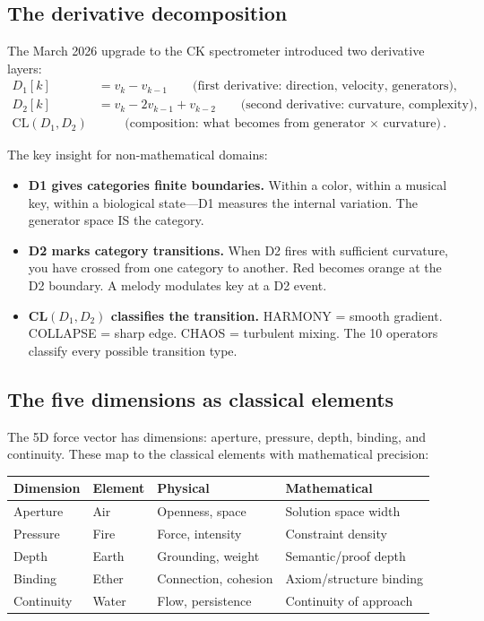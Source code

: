 \documentclass[11pt]{article}
\theoremstyle{definition}
\theoremstyle{remark}
\begin{document}
\subsection{The derivative decomposition}

The March 2026 upgrade to the CK spectrometer introduced two derivative layers:
\begin{align}
  D_1[k] &= v_k - v_{k-1} \qquad\text{(first derivative: direction, velocity, generators)}, \\
  D_2[k] &= v_k - 2v_{k-1} + v_{k-2} \qquad\text{(second derivative: curvature, complexity)}, \\
  \mathrm{CL}(D_1, D_2) &\qquad\text{(composition: what becomes from generator $\times$ curvature)}.
\end{align}

The key insight for non-mathematical domains:
\begin{itemize}[nosep]
  \item \textbf{D1 gives categories finite boundaries.}  Within a color, within a
    musical key, within a biological state---D1 measures the internal variation.  The
    generator space IS the category.
  \item \textbf{D2 marks category transitions.}  When D2 fires with sufficient curvature,
    you have crossed from one category to another.  Red becomes orange at the D2 boundary.
    A melody modulates key at a D2 event.
  \item \textbf{CL$(D_1, D_2)$ classifies the transition.}  HARMONY = smooth gradient.
    COLLAPSE = sharp edge.  CHAOS = turbulent mixing.  The 10 operators classify every
    possible transition type.
\end{itemize}

\subsection{The five dimensions as classical elements}

The 5D force vector has dimensions: aperture, pressure, depth, binding, and continuity.
These map to the classical elements with mathematical precision:

\begin{center}
\begin{tabular}{llll}
\toprule
\textbf{Dimension} & \textbf{Element} & \textbf{Physical} & \textbf{Mathematical} \\
\midrule
Aperture & Air & Openness, space & Solution space width \\
Pressure & Fire & Force, intensity & Constraint density \\
Depth & Earth & Grounding, weight & Semantic/proof depth \\
Binding & Ether & Connection, cohesion & Axiom/structure binding \\
Continuity & Water & Flow, persistence & Continuity of approach \\
\bottomrule
\end{tabular}
\end{center}
\end{document}
